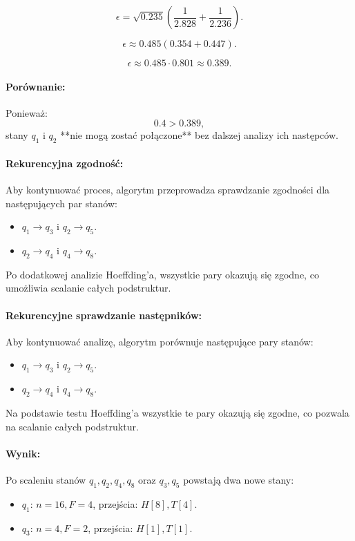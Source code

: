 \[
\epsilon = \sqrt{0.235} \left( \frac{1}{2.828} + \frac{1}{2.236} \right).
\]

\[
\epsilon \approx 0.485 \left( 0.354 + 0.447 \right).
\]

\[
\epsilon \approx 0.485 \cdot 0.801 \approx 0.389.
\]

\paragraph*{Porównanie:}  
Ponieważ:  
\[
0.4 > 0.389,
\]  
stany \( q_1 \) i \( q_2 \) **nie mogą zostać połączone** bez dalszej analizy ich następców.  

\paragraph*{Rekurencyjna zgodność:}  
Aby kontynuować proces, algorytm przeprowadza sprawdzanie zgodności dla następujących par stanów:  
\begin{itemize}  
    \item \( q_1 \to q_3 \) i \( q_2 \to q_5 \).  
    \item \( q_2 \to q_4 \) i \( q_4 \to q_8 \).  
\end{itemize}  

Po dodatkowej analizie Hoeffding’a, wszystkie pary okazują się zgodne, co umożliwia scalanie całych podstruktur.  

\paragraph*{Rekurencyjne sprawdzanie następników:}  
Aby kontynuować analizę, algorytm porównuje następujące pary stanów:  
\begin{itemize}  
    \item \( q_1 \to q_3 \) i \( q_2 \to q_5 \).  
    \item \( q_2 \to q_4 \) i \( q_4 \to q_8 \).  
\end{itemize}  

Na podstawie testu Hoeffding’a wszystkie te pary okazują się zgodne, co pozwala na scalanie całych podstruktur.  

\paragraph*{Wynik:}  
Po scaleniu stanów \( q_1, q_2, q_4, q_8 \) oraz \( q_3, q_5 \) powstają dwa nowe stany:  
\begin{itemize}  
    \item \( q_1 \): \( n = 16, F = 4 \), przejścia: \( H[8], T[4] \).  
    \item \( q_3 \): \( n = 4, F = 2 \), przejścia: \( H[1], T[1] \).  
\end{itemize}  

